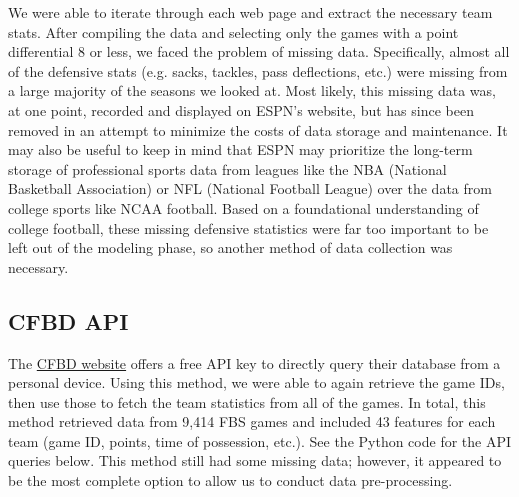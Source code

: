 \documentclass[11pt]{amsart}
\theoremstyle{definition}                  %
\theoremstyle{remark}                       %
\numberwithin{equation}{section}
\begin{document}
We were able to iterate through each web page and extract the necessary team stats. After compiling the data and selecting only the games with a point differential 8 or less, we faced the problem of missing data. Specifically, almost all of the defensive stats (e.g. sacks, tackles, pass deflections, etc.) were missing from a large majority of the seasons we looked at. Most likely, this missing data was, at one point, recorded and displayed on ESPN's website, but has since been removed in an attempt to minimize the costs of data storage and maintenance. It may also be useful to keep in mind that ESPN may prioritize the long-term storage of professional sports data from leagues like the NBA (National Basketball Association) or NFL (National Football League) over the data from college sports like NCAA football. Based on a foundational understanding of college football, these missing defensive statistics were far too important to be left out of the modeling phase, so another method of data collection was necessary.

\subsection{CFBD API}
The \href{collegefootballdata.com}{CFBD website} offers a free API key to directly query their database from a personal device. Using this method, we were able to again retrieve the game IDs, then use those to fetch the team statistics from all of the games. In total, this method retrieved data from 9,414 FBS games and included 43 features for each team (game ID, points, time of possession, etc.). See the Python code for the API queries below. This method still had some missing data; however, it appeared to be the most complete option to allow us to conduct data pre-processing.
\end{document}
